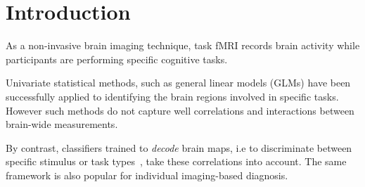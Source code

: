 



\section{Introduction}

As a non-invasive brain imaging technique, task fMRI records brain
activity while participants are
performing specific cognitive tasks.

Univariate statistical methods, such as general linear models (GLMs)
\cite{friston1995analysis} have been successfully applied to
identifying the brain regions involved in specific tasks.
%
However such methods do not capture well correlations and interactions between brain-wide measurements.

By contrast, classifiers trained 
to \emph{decode} brain maps, i.e to discriminate between specific stimulus or task types~\cite{shirer_decoding_2012,varoquaux_how_2014,loula_decoding_2018}, take these correlations into account. 
%
The same framework is also popular for individual imaging-based diagnosis.

